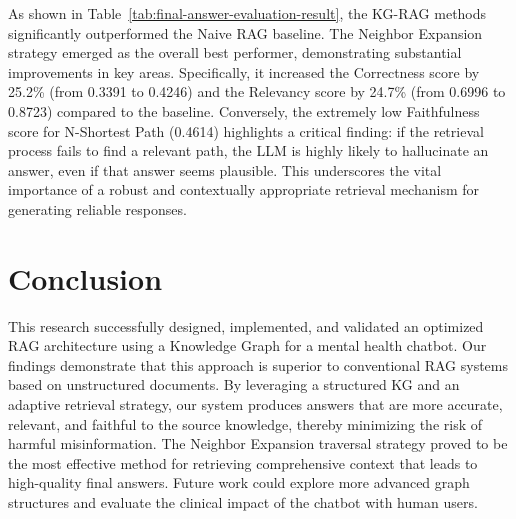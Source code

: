 \documentclass[conference]{IEEEtran}
\begin{document}
As shown in Table~\ref{tab:final-answer-evaluation-result},  the KG-RAG methods significantly outperformed the Naive RAG baseline.
The Neighbor Expansion strategy emerged as the overall best performer, demonstrating substantial improvements in key areas.
Specifically, it increased the Correctness score by 25.2\% (from 0.3391 to 0.4246) and the Relevancy score by 24.7\% (from 0.6996 to 0.8723) compared to the baseline.
Conversely, the extremely low Faithfulness score for N-Shortest Path (0.4614) highlights a critical finding: if the retrieval process fails to find a relevant path, the LLM is highly likely to hallucinate an answer, even if that answer seems plausible.
This underscores the vital importance of a robust and contextually appropriate retrieval mechanism for generating reliable responses.

\section{Conclusion}
This research successfully designed, implemented, and validated an optimized RAG architecture using a Knowledge Graph for a mental health chatbot.
Our findings demonstrate that this approach is superior to conventional RAG systems based on unstructured documents.
By leveraging a structured KG and an adaptive retrieval strategy, our system produces answers that are more accurate, relevant, and faithful to the source knowledge, thereby minimizing the risk of harmful misinformation.
The Neighbor Expansion traversal strategy proved to be the most effective method for retrieving comprehensive context that leads to high-quality final answers.
Future work could explore more advanced graph structures and evaluate the clinical impact of the chatbot with human users.

%
%
%
\end{document}
